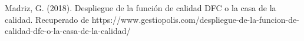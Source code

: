 \begin{thebibliography}{}
    Madriz, G. (2018). Despliegue de la función de calidad DFC o la casa de la
    calidad. Recuperado de https://www.gestiopolis.com/despliegue-de-la-funcion-de-calidad-dfc-o-la-casa-de-la-calidad/
    
    \end{thebibliography}
